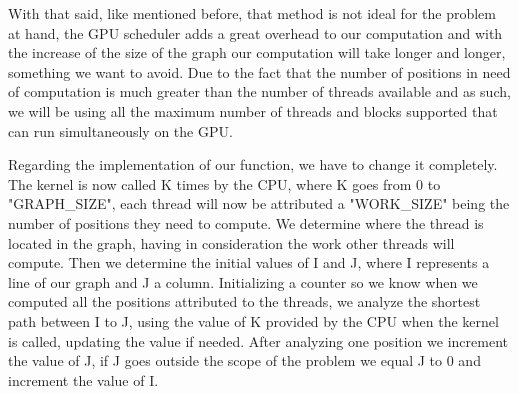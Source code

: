 \documentclass[conference]{IEEEtran}
\begin{document}
With that said, like mentioned before, that method is not ideal for the problem at hand, the GPU scheduler adds a great overhead to our computation and with the increase of the size of the graph our computation will take longer and longer, something we want to avoid. Due to the fact that the number of positions in need of computation is much greater than the number of threads available and as such, we will be using all the maximum number of threads and blocks supported that can run simultaneously on the GPU. 

Regarding the implementation of our function, we have to change it completely.
The kernel is now called K times by the CPU, where K goes from 0 to "GRAPH\_SIZE", 
each thread will now be attributed a "WORK\_SIZE" being the number of positions they need to compute. 
We determine where the thread is located in the graph, having in consideration the work other threads will compute. Then we determine the initial values of I and J, where I represents a line of our graph and J a column. Initializing a counter so we know when we computed all the positions attributed to the threads, we analyze the shortest path between I to J, using the value of K provided by the CPU when the kernel is called, updating the value if needed. After analyzing one position we increment the value of J, if J goes outside the scope of the problem we equal J to 0 and increment the value of I.
\end{document}
